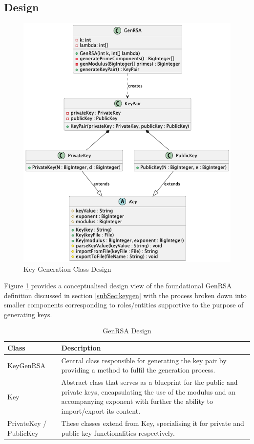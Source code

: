 \documentclass[]{final_report}
\theoremstyle{definition}
\begin{document}
\subsection{Design}
\begin{figure}[H]
    \centering
    \includegraphics[scale=0.48]{main_pictures/KeyGeneration.png}
    \caption{Key Generation Class Design}
    \label{fig:kg}
\end{figure}

Figure \ref{fig:kg} provides a conceptualised design view of the foundational GenRSA definition discussed in section  \ref{subSec:keygen} with the process broken down into smaller components corresponding to roles/entities supportive to the purpose of generating keys. 


\begin{table}[H]
    \centering
    \caption{GenRSA Design}
    \label{tab:actors_description}
    \begin{tabular}{|l|p{10cm}|}
    \hline
    \textbf{Class} & \textbf{Description} \\
    \hline
    KeyGenRSA & Central class responsible for generating the key pair by providing a method to fulfil the generation process. \\
    \hline
    Key & Abstract class that serves as a blueprint for the public and private keys, encapsulating the use of the modulus and an accompanying exponent with further the ability to import/export its content. \\
    \hline
    PrivateKey / PublicKey & These classes extend from Key, specialising it for private and public key functionalities respectively. \\
    \hline
    \end{tabular}
\end{table}
\end{document}
